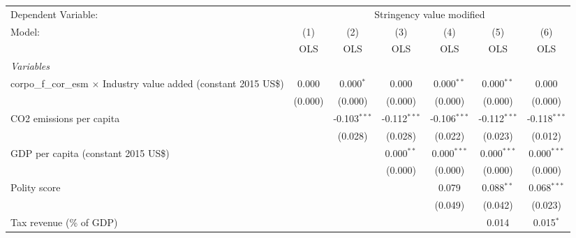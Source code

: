 
\begingroup
\centering
\begin{tabular}{lcccccc}
   \toprule
   Dependent Variable: & \multicolumn{6}{c}{Stringency value modified}\\
   Model:                                                                     & (1)     & (2)            & (3)            & (4)            & (5)            & (6)\\  
                                                                              &  OLS    & OLS            & OLS            & OLS            & OLS            & OLS\\  
   \midrule
   \emph{Variables}\\
   corpo\_f\_cor\_esm $\times$ Industry value added (constant 2015 US\$)      & 0.000   & 0.000$^{*}$    & 0.000          & 0.000$^{**}$   & 0.000$^{**}$   & 0.000\\   
                                                                              & (0.000) & (0.000)        & (0.000)        & (0.000)        & (0.000)        & (0.000)\\   
   CO2 emissions per capita                                                   &         & -0.103$^{***}$ & -0.112$^{***}$ & -0.106$^{***}$ & -0.112$^{***}$ & -0.118$^{***}$\\   
                                                                              &         & (0.028)        & (0.028)        & (0.022)        & (0.023)        & (0.012)\\   
   GDP per capita (constant 2015 US\$)                                        &         &                & 0.000$^{**}$   & 0.000$^{***}$  & 0.000$^{***}$  & 0.000$^{***}$\\   
                                                                              &         &                & (0.000)        & (0.000)        & (0.000)        & (0.000)\\   
   Polity score                                                               &         &                &                & 0.079          & 0.088$^{**}$   & 0.068$^{***}$\\   
                                                                              &         &                &                & (0.049)        & (0.042)        & (0.023)\\   
   Tax revenue (\% of GDP)                                                    &         &                &                &                & 0.014          & 0.015$^{*}$\\   

\end{tabular}
